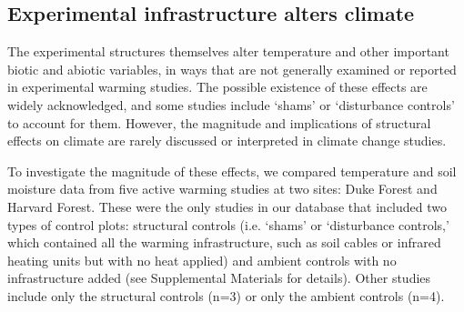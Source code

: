 \documentclass{article}
\begin{document}
\subsection* {Experimental infrastructure alters climate}
The experimental structures themselves alter temperature and other important biotic and abiotic variables, in ways that are not generally examined or reported in experimental warming studies. The possible existence of these effects are widely acknowledged, and some studies include `shams' or `disturbance controls' to account for them. However, the magnitude and implications of structural effects on climate are rarely discussed or interpreted in climate change studies.

\par To investigate the magnitude of these effects, we compared temperature and soil moisture data from five active warming studies at two sites: Duke Forest and Harvard Forest\citep{farnsworth1995,clark2014a, marchin2015, pelini2011}. These were the only studies in our database that included two types of control plots: structural controls (i.e. `shams' or `disturbance controls,' which contained all the warming infrastructure, such as soil cables or infrared heating units but with no heat applied) and ambient controls with no infrastructure added (see Supplemental Materials for details). Other studies include only the structural controls (n=3) or only the ambient controls (n=4).

\end{document}
